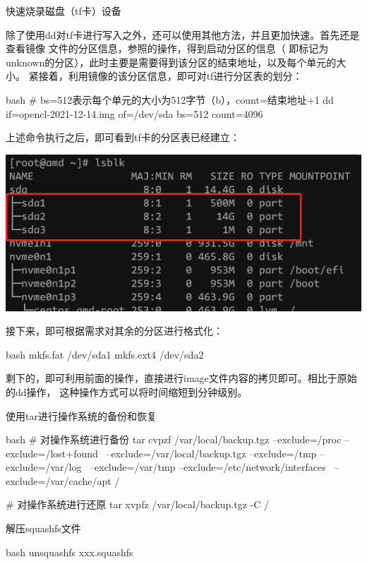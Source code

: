 \begin{outline}[enumerate]
\1 快速烧录磁盘（tf卡）设备

除了使用dd对tf卡进行写入之外，还可以使用其他方法，并且更加快速。首先还是查看镜像
文件的分区信息，参照的操作，得到启动分区的信息（
即标记为unknown的分区），此时主要是需要得到该分区的结束地址，以及每个单元的大小。
紧接着，利用镜像的该分区信息，即可对tf进行分区表的划分：
\begin{code-block}{bash}
# bs=512表示每个单元的大小为512字节（b），count=结束地址+1
dd if=opencl-2021-12-14.img of=/dev/sda bs=512 count=4096
\end{code-block}

上述命令执行之后，即可看到tf卡的分区表已经建立：
\par\begin{minipage}{\linewidth}
  \centering
  \includegraphics[width=\linewidth]{tf_partition.png}
  \label{fig:tf_partition}
\end{minipage}

接下来，即可根据需求对其余的分区进行格式化：
\begin{code-block}{bash}
mkfs.fat /dev/sda1
mkfs.ext4 /dev/sda2
\end{code-block}

剩下的，即可利用前面的操作，直接进行image文件内容的拷贝即可。相比于原始的dd操作，
这种操作方式可以将时间缩短到分钟级别。

\1 使用tar进行操作系统的备份和恢复
\begin{code-block}{bash}
# 对操作系统进行备份
tar cvpzf /var/local/backup.tgz --exclude=/proc --exclude=/lost+found \
    --exclude=/var/local/backup.tgz --exclude=/tmp --exclude=/var/log \
    --exclude=/var/tmp --exclude=/etc/network/interfaces \
    --exclude=/var/cache/apt /

# 对操作系统进行还原
tar xvpfz /var/local/backup.tgz -C /
\end{code-block}

\1 解压squashfs文件
\begin{code-block}{bash}
unsquashfs xxx.squashfs
\end{code-block}


\end{outline}
